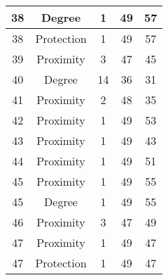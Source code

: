 \documentclass[results.tex]{subfiles}
\begin{document}
\begin{center}
\begin{tabular}{| c || c | c | c | c |}
            \hline
            38                      & Degree                       & 1                      & 49                      & 57                   \\
            \hline
            38                      & Protection                   & 1                      & 49                      & 57                   \\
            \hline
            39                      & Proximity                    & 3                      & 47                      & 45                   \\
            \hline
            40                      & Degree                       & 14                     & 36                      & 31                   \\
            \hline
            41                      & Proximity                    & 2                      & 48                      & 35                   \\
            \hline
            42                      & Proximity                    & 1                      & 49                      & 53                   \\
            \hline
            43                      & Proximity                    & 1                      & 49                      & 43                   \\
            \hline
            44                      & Proximity                    & 1                      & 49                      & 51                   \\
            \hline
            45                      & Proximity                    & 1                      & 49                      & 55                   \\
            \hline
            45                      & Degree                       & 1                      & 49                      & 55                   \\
            \hline
            46                      & Proximity                    & 3                      & 47                      & 49                   \\
            \hline
            47                      & Proximity                    & 1                      & 49                      & 47                   \\
            \hline
            47                      & Protection                   & 1                      & 49                      & 47                   \\

\end{tabular}
\end{center}
\end{document}
